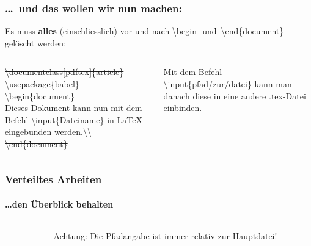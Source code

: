 
\begin{frame}
\frametitle{\ldots ~und das wollen wir nun machen:}
Es muss \textbf{alles} (einschliesslich) vor und nach \color{unibablueI}\textbackslash begin\color{black}- 
und\color{unibablueI}~\textbackslash end\color{black}\{document\} gel\"oscht werden:\\[5mm]
\begin{columns}
\begin{column}{.47\textwidth}
\sout{\color{nounibaredI}\color{nounibaredI}\textbackslash documentclass\color{black}\color{nounibagreenI}[pdftex]\color{black}\{article\} \\
\color{nounibaredI}\textbackslash usepackage\color{black}\{babel\}\\
\color{nounibaredI}\color{unibablueI}\textbackslash\color{unibablueI}begin\color{black}\color{black}\{document\} }\\
Dieses Dokument kann nun mit dem Befehl \color{nounibaredI}\color{nounibaredI}\textbackslash input\color{nounibaredI}\color{black}\{Dateiname\} in LaTeX eingebunden werden.\color{nounibaredI}\color{nounibaredI}\textbackslash \color{nounibaredI}\textbackslash \color{black}  \\
\sout{\color{nounibaredI}\color{unibablueI}\textbackslash\color{unibablueI}end\color{black}\color{black}\{document\} }
\end{column}
\begin{column}{.47\textwidth}
Mit dem Befehl \color{nounibaredI}\textbackslash input\color{black}\{pfad/zur/datei\} kann man danach
 diese in eine andere {\ttfamily .tex}-Datei einbinden.

\end{column}
\end{columns}
\end{frame}


\begin{frame}
\frametitle{Verteiltes Arbeiten}
\framesubtitle{\ldots den \"Uberblick behalten}
\begin{columns}
\begin{column}{.6\textwidth}
\end{column}
\begin{column}{.3\textwidth}
\begin{alertblock}{Achtung:}
Die Pfadangabe ist immer relativ zur Hauptdatei!
\end{alertblock}
\end{column}
\end{columns}

\end{frame}


